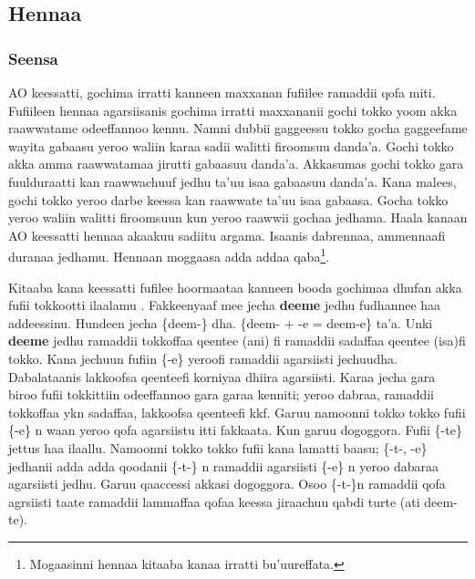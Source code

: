 \documentclass[11pt,b5paper]{book}
\begin{document}
\subsection{Hennaa}

\subsubsection{Seensa}
AO keessatti, gochima irratti kanneen maxxanan fufiilee ramaddii qofa miti. Fufiileen hennaa agarsiisanis gochima
irratti maxxananii gochi tokko yoom akka raawwatame odeeffannoo kennu. Namni dubbii gaggeessu tokko gocha
gaggeefame wayita gabaasu yeroo waliin karaa sadii walitti firoomsuu danda'a. Gochi tokko akka amma raawwatamaa
jirutti gabaasuu danda'a. Akkasumas gochi tokko gara fuulduraatti kan raawwachuuf jedhu ta'uu isaa gabaasuu
danda'a. Kana malees, gochi tokko yeroo darbe keessa kan raawwate ta'uu isaa gabaasa. Gocha tokko yeroo waliin walitti firoomsuun kun yeroo raawwii gochaa jedhama. Haala kanaan AO keessatti hennaa akaakuu sadiitu argama. Isaanis dabrennaa, ammennaafi duranaa jedhamu\cite{aadaa1995,margaa2010}. Hennaan moggaasa adda addaa qaba\cite{beekamaa1996,file2015}\footnote{Mogaasinni hennaa kitaaba kanaa \cite{aadaa1995} irratti bu’uureffata.}. 

Kitaaba kana keessatti fufilee hoormaataa kanneen booda gochimaa dhufan akka fufii tokkootti ilaalamu \cite{griefenow2001grammatical,owens1985grammar,gragg1976oromo,margaa2010}. Fakkeenyaaf mee jecha \textbf{deeme} jedhu fudhannee haa addeessinu. Hundeen jecha \{deem-\} dha. \{deem- + -e = deem-e\} ta’a. Unki \textbf{deeme} jedhu ramaddii tokkoffaa qeentee (ani) fi ramaddii sadaffaa qeentee (isa)fi tokko. Kana jechuun fufiin \{-e\} yeroofi ramaddii agarsiisti jechuudha. Dabalataanis lakkoofsa qeenteefi korniyaa dhiira agarsiisti. Karaa jecha gara biroo fufii tokkittiin odeeffannoo gara garaa kenniti; yeroo dabraa, ramaddii tokkoffaa ykn sadaffaa, lakkoofsa qeenteefi kkf. Garuu namoonni tokko tokko fufii \{-e\} n waan yeroo qofa agarsiistu itti fakkaata. Kun garuu dogoggora. Fufii \{-te\} jettus haa ilaallu. Namoonni tokko tokko fufii kana lamatti baasu; \{-t-, -e\} jedhanii adda adda qoodanii \{-t-\} n ramaddii agarsiisti \{-e\} n yeroo dabaraa agarsiisti jedhu. Garuu qaaccessi akkasi dogoggora. Osoo \{-t-\}n ramaddii qofa agrsiisti taate ramaddii lammaffaa qofaa keessa jiraachuu qabdi turte (ati deem-te). 
\end{document}
